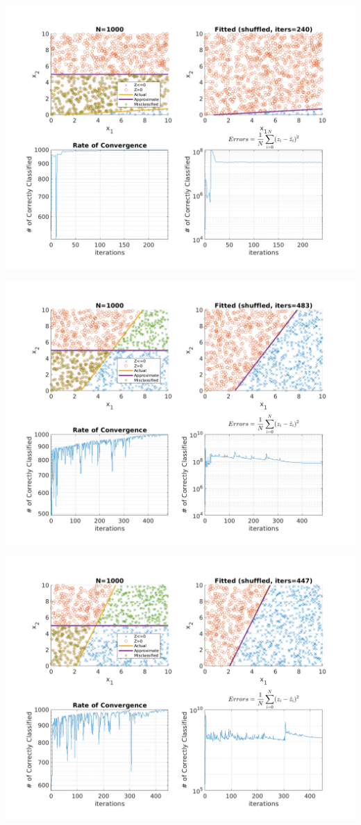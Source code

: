 \documentclass{article}
\newenvironment{Figure}
  {\par\medskip\noindent\minipage{\linewidth}}
  {\endminipage\par\medskip}
\begin{document}
\begin{multicols}{2}
\begin{Figure}
\centering
\includegraphics[width=\linewidth]{pngs/n1000_shuffled1.png}
\end{Figure}
\begin{Figure}
\centering
\includegraphics[width=\linewidth]{pngs/n1000_shuffled2.png}
\end{Figure}
\begin{Figure}
\centering
\includegraphics[width=\linewidth]{pngs/n1000_shuffled3.png}

\end{Figure}
\end{multicols}
\end{document}
